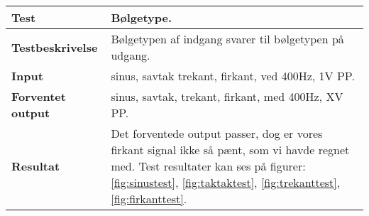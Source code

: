 

\begin{center}
	\begin{tabular}{ | m{} | m{}|} 
		\hline
		\textbf{Test}					&Bølgetype. \\ \hline
		\textbf{Testbeskrivelse}		&Bølgetypen af indgang svarer til bølgetypen på udgang. \\ \hline
		\textbf{Input}					&sinus, savtak trekant, firkant, ved 400Hz, 1V PP. \\ \hline
		\textbf{Forventet output}		&sinus, savtak, trekant, firkant, med 400Hz, XV PP. \\ \hline
		\textbf{Resultat}				&Det forventede output passer, dog er vores firkant signal ikke så pænt, som vi havde regnet med. Test resultater kan ses på figurer: \ref{fig:sinustest}, \ref{fig:taktaktest}, \ref{fig:trekanttest}, \ref{fig:firkanttest}.  \\ \hline
	\end{tabular}
\end{center}